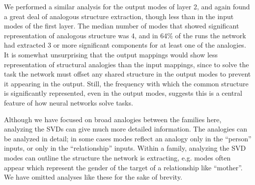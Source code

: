 \documentclass[10pt,letterpaper]{article}
\begin{document}
We performed a similar analysis for the output modes of layer 2, and again found a great deal of analogous structure extraction, though less than in the input modes of the first layer. The median number of modes that showed significant representation of analogous structure was 4, and in 64\% of the runs the network had extracted 3 or more significant components for at least one of the analogies. It is somewhat unsurprising that the output mappings would show less representation of structural analogies than the input mappings, since to solve the task the network must offset any shared structure in the output modes to prevent it appearing in the output. Still, the frequency with which the common structure is significantly represented, even in the output modes, suggests this is a central feature of how neural networks solve tasks. \par  
Although we have focused on broad analogies between the families here, analyzing the SVDs can give much more detailed information. The analogies can be analyzed in detail; in some cases modes reflect an analogy only in the ``person'' inputs, or only in the ``relationship'' inputs. Within a family, analyzing the SVD modes can outline the structure the network is extracting, e.g. modes often appear which represent the gender of the target of a relationship like ``mother''. We have omitted analyses like these for the sake of brevity. \par 
\end{document}
